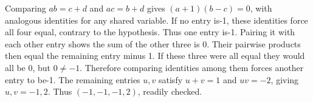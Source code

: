 Comparing $ab=c+d$ and $ac=b+d$ gives $(a+1)(b-c)=0$, with analogous identities for any shared variable. If no entry is-1, these identities force all four equal, contrary to the hypothesis. Thus one entry is-1. Pairing it with each other entry shows the sum of the other three is 0. Their pairwise products then equal the remaining entry minus 1. If these three were all equal they would all be 0, but $0\ne-1$. Therefore comparing identities among them forces another entry to be-1. The remaining entries $u,v$ satisfy $u+v=1$ and $uv=-2$, giving $u,v=-1,2$. Thus $\boxed{(-1,-1,-1,2)}$, readily checked.
